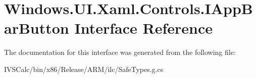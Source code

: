 \hypertarget{interface_windows_1_1_u_i_1_1_xaml_1_1_controls_1_1_i_app_bar_button}{}\section{Windows.\+U\+I.\+Xaml.\+Controls.\+I\+App\+Bar\+Button Interface Reference}
\label{interface_windows_1_1_u_i_1_1_xaml_1_1_controls_1_1_i_app_bar_button}


The documentation for this interface was generated from the following file\+:\begin{DoxyCompactItemize}
\item 
I\+V\+S\+Calc/bin/x86/\+Release/\+A\+R\+M/ilc/Safe\+Types.\+g.\+cs\end{DoxyCompactItemize}
